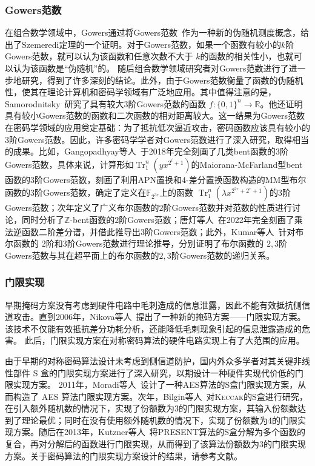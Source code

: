 \documentclass[a4paper,zihao=-4,AutoFakeBold]{ctexart}
\newcommand{\Tr}{\operatorname{Tr}_1^n}
\newcommand{\F}{\mathbb{F}}
\newcommand{\Z}{\mathbb{Z}}
\begin{document}
\subsubsection{Gowers范数}
在组合数学领域中，Gowers通过将Gowers范数~\cite{Gowers1998A}作为一种新的伪随机测度概念，给出了Szemeredi定理的一个证明。对于Gowers范数，如果一个函数有较小的$k$阶Gowers范数，就可以认为该函数和任意次数不大于 $k$的函数的相关性小，也就可以认为该函数是``伪随机''的。
随后组合数学领域研究者对Gowers范数进行了进一步地研究，得到了许多深刻的结论。此外，由于Gowers范数衡量了函数的伪随机性，使其在理论计算机和密码学领域有广泛地应用。其中值得注意的是，Samorodnitsky~\cite{SamSTOCy07}研究了具有较大$3$阶Gowers范数的函数 $f:\{0,1\}^n\to\mathbb{R}$。他还证明具有较小Gowers范数的函数和二次函数的相对距离较大。这一结果为Gowers范数在密码学领域的应用奠定基础：为了抵抗低次逼近攻击，密码函数应该具有较小的$3$阶Gowers范数。因此，许多密码学学者对Gowers范数进行了深入研究，取得相当的成果。比如，Gangopadhyay等人~\cite{GMS18}于2018年完全刻画了几类bent函数的$3$阶Gowers范数，具体来说，计算形如$\Tr(yx^{2^i+1})$的Maiorana-McFarland型bent函数的$3$阶Gowers范数，刻画了利用APN置换和4-差分置换函数构造的MM型布尔函数的$3$阶Gowers范数，确定了定义在$\F_{2^{3r}}$上的函数 $\Tr(\lambda x^{2^{2r}+2^r+1})$的$3$阶Gowers范数；次年定义了广义布尔函数的$2$阶Gowers范数并对范数的性质进行讨论，同时分析了$\Z$-bent函数的$2$阶Gowers范数；唐灯等人~\cite{InverseFuncDAM2021}在2022年完全刻画了乘法逆函数二阶差分谱，并借此推导出$3$阶Gowers范数；此外，Kumar等人~\cite{KumarMG23u2u3}针对布尔函数的 $2$阶和$3$阶Gowers范数进行理论推导，分别证明了布尔函数的 $2,3$阶Gowers范数与其在超平面上的布尔函数的$2,3$阶Gowers范数的递归关系。

\subsubsection{门限实现}
早期掩码方案没有考虑到硬件电路中毛刺造成的信息泄露，因此不能有效抵抗侧信道攻击。直到2006年，Nikova等人~\cite{Nikova06TI}提出了一种新的掩码方案——门限实现方案。该技术不仅能有效抵抗差分功耗分析，还能降低毛刺现象引起的信息泄露造成的危害。
此后，门限实现方案在对称密码算法的硬件电路实现上有了大范围的应用。

由于早期的对称密码算法设计未考虑到侧信道防护，国内外众多学者对其关键非线性部件 S 盒的门限实现方案进行了深入研究，以期设计一种硬件实现代价低的门限实现方案。
2011年，Moradi等人~\cite{moradiPushingLimitsVery2011}设计了一种AES算法的S盒门限实现方案，从而构造了 AES 算法门限实现方案。次年，Bilgin等人~\cite{BilginCARDIS13}对\textsc{Keccak}的S盒进行研究，在引入额外随机数的情况下，实现了份额数为3的门限实现方案，其输入份额数达到了理论最优；同时在没有使用额外随机数的情况下，实现了份额数为4的门限实现方案。随后在2013年，Kutzner等人~\cite{kutzner13decomposeSbox_TI}将PRESENT算法的S盒分解为多个函数的复合，再对分解后的函数进行门限实现，从而得到了该算法份额数为$3$的门限实现方案。关于密码算法的门限实现方案设计的结果，请参考文献。
\end{document}
